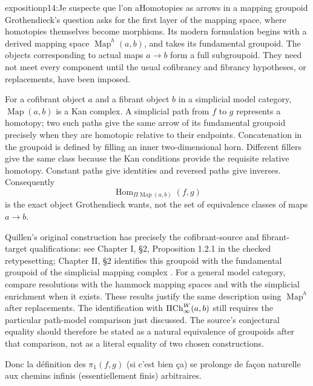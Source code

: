 \begin{dcomment}{exposition}{p14:Je suspecte que l'on a}{Homotopies as arrows in a mapping groupoid}
Grothendieck's question asks for the first layer of the mapping space, where homotopies themselves become morphisms. Its modern formulation begins with a derived mapping space $\operatorname{Map}^{h}(a,b)$, and takes its fundamental groupoid. The objects corresponding to actual maps $a\to b$ form a full subgroupoid. They need not meet every component until the usual cofibrancy and fibrancy hypotheses, or replacements, have been imposed.

For a cofibrant object $a$ and a fibrant object $b$ in a simplicial model category, $\operatorname{Map}(a,b)$ is a Kan complex. A simplicial path from $f$ to $g$ represents a homotopy; two such paths give the same arrow of its fundamental groupoid precisely when they are homotopic relative to their endpoints. Concatenation in the groupoid is defined by filling an inner two-dimensional horn. Different fillers give the same class because the Kan conditions provide the requisite relative homotopy. Constant paths give identities and reversed paths give inverses. Consequently
\[
 \operatorname{Hom}_{\Pi\operatorname{Map}(a,b)}(f,g)
\]
is the exact object Grothendieck wants, not the set of equivalence classes of maps $a\to b$.

Quillen's original construction has precisely the cofibrant-source and fibrant-target qualifications: see Chapter I, \S2, Proposition 1.2.1 in the checked retypesetting; Chapter II, \S2 identifies this groupoid with the fundamental groupoid of the simplicial mapping complex \citep{Quillen1967}. For a general model category, \citet[Propositions 4.4--4.5 and 4.8]{DwyerKan1980Function} compare resolutions with the hammock mapping spaces and with the simplicial enrichment when it exists. These results justify the same description using $\operatorname{Map}^{h}$ after replacements. The identification with $\Pi\mathrm{Ch}^W_\infty(a,b)$ still requires the particular path-model comparison just discussed. The source's conjectural equality should therefore be stated as a natural equivalence of groupoids after that comparison, not as a literal equality of two chosen constructions.
\end{dcomment}



Donc la définition des $\pi_1(f,g)$ (si c'est bien ça) se prolonge de façon naturelle aux chemins infinis (essentiellement finis) arbitraires.

